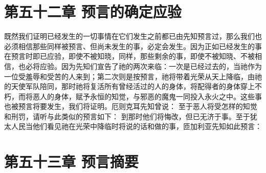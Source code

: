 
\section{第五十二章 预言的确定应验}

既然我们证明已经发生的一切事情在它们发生之前都已由先知预言过，那么我们也必须相信那些同样被预言、但尚未发生的事，必定会发生。因为正如已经发生的事在预言时即已应验，即使不被知晓，同样，那些剩余的事，即使不被知晓、不被相信，也必将应验。因为先知们宣告了祂的两次来临：一次是已经过去的，当祂作为一位受羞辱和受苦的人来到；第二次则是按预言，祂将带着光荣从天上降临，由祂的天使军队陪同，那时祂将复活所有曾经活过的人的身体，将配得者的身体穿上不朽，而将恶人的身体，赋予永恒的知觉，与邪恶的魔鬼一同投入永火之中。这些事也被预言将要发生，我们将证明。厄则克耳先知曾说： 至于恶人将受怎样的知觉和刑罚，请听与此类似的预言如下： 到那时他们将悔改，但已无济于事。至于犹太人民当他们看见祂在光荣中降临时将说的话和做的事，匝加利亚先知如此预言：\par


\section{第五十三章 预言摘要}

